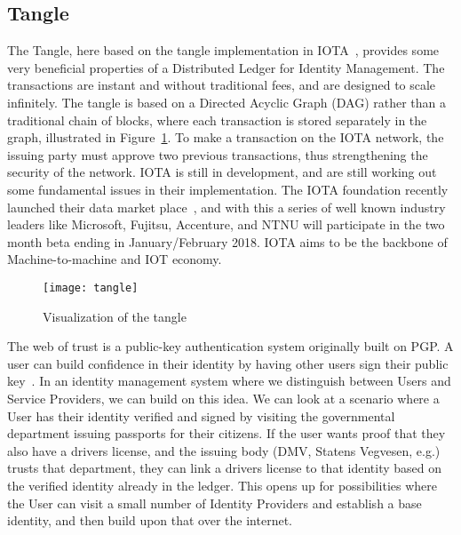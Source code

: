 \subsection{Tangle}

The Tangle, here based on the tangle implementation in IOTA~\cite{IOTA_Whitepaper}, provides some very beneficial properties of a Distributed Ledger for Identity Management. The transactions are instant and without traditional fees, and are designed to scale infinitely. The tangle is based on a Directed Acyclic Graph (DAG) rather than a traditional chain of blocks, where each transaction is stored separately in the graph, illustrated in Figure~\ref{fig:tangle}. To make a transaction on the IOTA network, the issuing party must approve two previous transactions, thus strengthening the security of the network. IOTA is still in development, and are still working out some fundamental issues in their implementation. The IOTA foundation recently launched their data market place~\cite{IOTA_Marketplace}, and with this a series of well known industry leaders like Microsoft, Fujitsu, Accenture, and NTNU will participate in the two month beta ending in January/February 2018. IOTA aims to be the backbone of Machine-to-machine and IOT economy.

\begin{figure}[ht]
    \centering
    \texttt{[image: tangle]}
    \caption{Visualization of the tangle \cite{IOTA_Whitepaper}}
    \label{fig:tangle}
\end{figure}
The web of trust is a public-key authentication system originally built on PGP. A user can build confidence in their identity by having other users sign their public key~\cite{Azouvi2017}. In an identity management system where we distinguish between Users and Service Providers, we can build on this idea. We can look at a scenario where a User has their identity verified and signed by visiting the governmental department issuing passports for their citizens. If the user wants proof that they also have a drivers license, and the issuing body (DMV, Statens Vegvesen, e.g.) trusts that department, they can link a drivers license to that identity based on the verified identity already in the ledger. This opens up for possibilities where the User can visit a small number of Identity Providers and establish a base identity, and then build upon that over the internet.